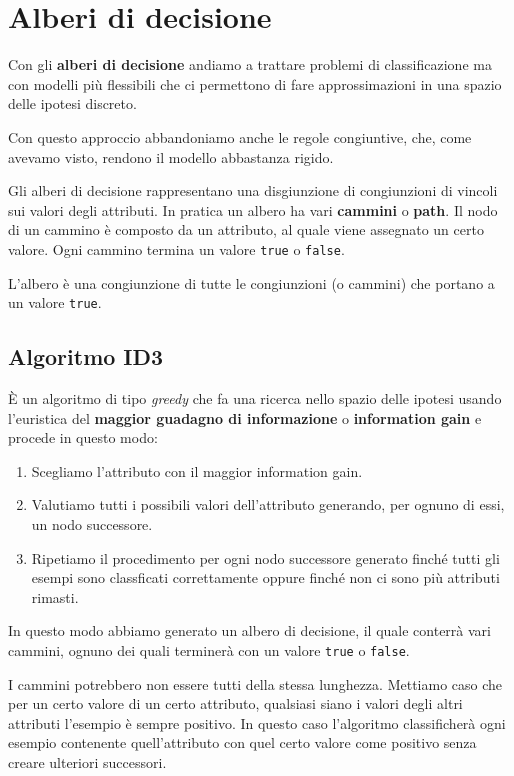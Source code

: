 \chapter{Alberi di decisione}
Con gli \textbf{alberi di decisione} andiamo a trattare problemi di classificazione ma con modelli pi\`u flessibili
che ci permettono di fare approssimazioni in una spazio delle ipotesi discreto.

Con questo approccio abbandoniamo anche le regole congiuntive, che, come avevamo visto, rendono il modello abbastanza
rigido.

Gli alberi di decisione rappresentano una disgiunzione di congiunzioni di vincoli sui valori degli attributi. In
pratica un albero ha vari \textbf{cammini} o \textbf{path}. Il nodo di un cammino \`e composto da un attributo, al
quale viene assegnato un certo valore. Ogni cammino termina un valore \verb|true| o \verb|false|.

L'albero \`e una congiunzione di tutte le congiunzioni (o cammini) che portano a un valore \verb|true|.

\section{Algoritmo ID3}
\`E un algoritmo di tipo \emph{greedy} che fa una ricerca nello spazio delle ipotesi usando l'euristica del
\textbf{maggior guadagno di informazione} o \textbf{information gain} e procede in questo modo:
\begin{enumerate}
	\item Scegliamo l'attributo con il maggior information gain.
	\item Valutiamo tutti i possibili valori dell'attributo generando, per ognuno di essi, un nodo successore.
	\item Ripetiamo il procedimento per ogni nodo successore generato finch\'e tutti gli esempi sono classficati
	      correttamente oppure finch\'e non ci sono pi\`u attributi rimasti.
\end{enumerate}
In questo modo abbiamo generato un albero di decisione, il quale conterr\`a vari cammini, ognuno dei quali terminer\`a
con un valore \verb|true| o \verb|false|.

I cammini potrebbero non essere tutti della stessa lunghezza. Mettiamo caso che per un certo valore di un certo
attributo, qualsiasi siano i valori degli altri attributi l'esempio \`e sempre positivo. In questo caso l'algoritmo
classificher\`a ogni esempio contenente quell'attributo con quel certo valore come positivo senza creare ulteriori
successori.

